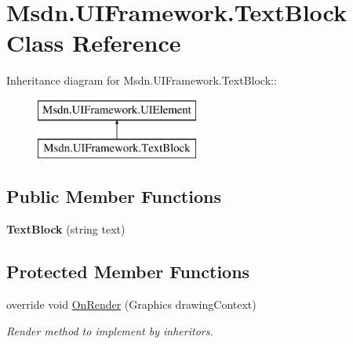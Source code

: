 \hypertarget{class_msdn_1_1_u_i_framework_1_1_text_block}{
\section{Msdn.UIFramework.TextBlock Class Reference}
\label{class_msdn_1_1_u_i_framework_1_1_text_block}
}
Inheritance diagram for Msdn.UIFramework.TextBlock::\begin{figure}[H]
\begin{center}
\leavevmode
\includegraphics[height=2cm]{class_msdn_1_1_u_i_framework_1_1_text_block}
\end{center}
\end{figure}
\subsection*{Public Member Functions}
\begin{DoxyCompactItemize}
\item 
\hypertarget{class_msdn_1_1_u_i_framework_1_1_text_block_a52a670b89c27c1e53ad58feb2fe2d205}{
{\bfseries TextBlock} (string text)}
\label{class_msdn_1_1_u_i_framework_1_1_text_block_a52a670b89c27c1e53ad58feb2fe2d205}

\end{DoxyCompactItemize}
\subsection*{Protected Member Functions}
\begin{DoxyCompactItemize}
\item 
override void \hyperlink{class_msdn_1_1_u_i_framework_1_1_text_block_a64a6a9fdda4cfe9c5781d1c54ce3da84}{OnRender} (Graphics drawingContext)
\begin{DoxyCompactList}\small\item\em Render method to implement by inheritors. \item\end{DoxyCompactList}\end{DoxyCompactItemize}
